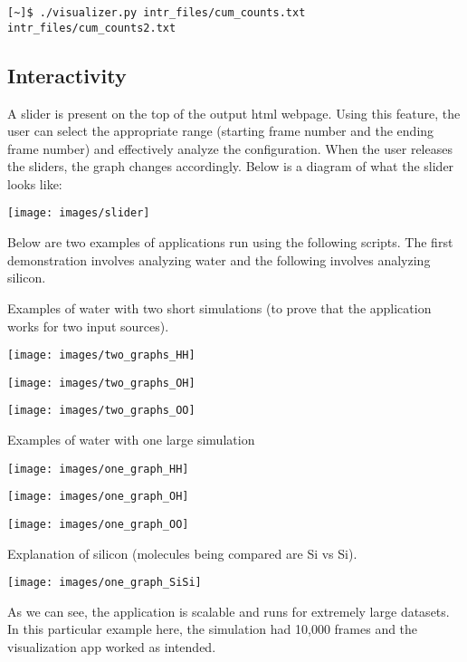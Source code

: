\begin{verbatim}
[~]$ ./visualizer.py intr_files/cum_counts.txt intr_files/cum_counts2.txt 
\end{verbatim}


\subsection*{Interactivity}

A slider is present on the top of the output html webpage. Using this feature, the user can select the appropriate range (starting frame number and the ending frame number) and effectively analyze the configuration. When the user releases the sliders, the graph changes accordingly. Below is a diagram of what the slider looks like:


\texttt{[image: images/slider]}


Below are two examples of applications run using the following scripts. The first demonstration involves analyzing water and the following involves analyzing silicon. 

Examples of water with two short simulations (to prove that the application works for two input sources).

\texttt{[image: images/two\_graphs\_HH]}

\texttt{[image: images/two\_graphs\_OH]}

\texttt{[image: images/two\_graphs\_OO]}

Examples of water with one large simulation

\texttt{[image: images/one\_graph\_HH]}

\texttt{[image: images/one\_graph\_OH]}

\texttt{[image: images/one\_graph\_OO]}

Explanation of silicon (molecules being compared are Si vs Si).

\texttt{[image: images/one\_graph\_SiSi]}

As we can see, the application is scalable and runs for extremely large datasets. In this particular example here, the simulation had 10,000 frames and the visualization app worked as intended.